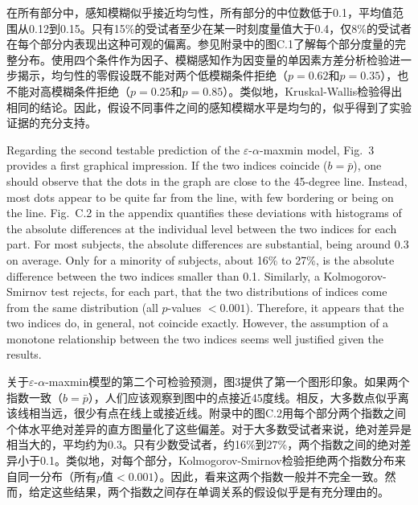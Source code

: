 \documentclass[12pt,a4paper]{article}
\newenvironment{original}
  {\par\medskip\noindent\color{black}\ignorespaces}
  {\par\medskip}
\newenvironment{translation}
  {\par\noindent\color{transblue}\ignorespaces}
  {\par\medskip\medskip}
\begin{document}
\begin{translation}
在所有部分中，感知模糊似乎接近均匀性，所有部分的中位数低于0.1，平均值范围从0.12到0.15。只有15\%的受试者至少在某一时刻度量值大于0.4，仅8\%的受试者在每个部分内表现出这种可观的偏离。参见附录中的图C.1了解每个部分度量的完整分布。使用四个条件作为因子、模糊感知作为因变量的单因素方差分析检验进一步揭示，均匀性的零假设既不能对两个低模糊条件拒绝（$p = 0.62$和$p = 0.35$），也不能对高模糊条件拒绝（$p = 0.25$和$p = 0.85$）。类似地，Kruskal-Wallis检验得出相同的结论。因此，假设不同事件之间的感知模糊水平是均匀的，似乎得到了实验证据的充分支持。
\end{translation}

\begin{original}
Regarding the second testable prediction of the $\varepsilon$-$\alpha$-maxmin model, Fig.\ 3 provides a first graphical impression. If the two indices coincide ($b = \bar{p}$), one should observe that the dots in the graph are close to the 45-degree line. Instead, most dots appear to be quite far from the line, with few bordering or being on the line. Fig.\ C.2 in the appendix quantifies these deviations with histograms of the absolute differences at the individual level between the two indices for each part. For most subjects, the absolute differences are substantial, being around 0.3 on average. Only for a minority of subjects, about 16\% to 27\%, is the absolute difference between the two indices smaller than 0.1. Similarly, a Kolmogorov-Smirnov test rejects, for each part, that the two distributions of indices come from the same distribution (all $p$-values $< 0.001$). Therefore, it appears that the two indices do, in general, not coincide exactly. However, the assumption of a monotone relationship between the two indices seems well justified given the results.
\end{original}

\begin{translation}
关于$\varepsilon$-$\alpha$-maxmin模型的第二个可检验预测，图3提供了第一个图形印象。如果两个指数一致（$b = \bar{p}$），人们应该观察到图中的点接近45度线。相反，大多数点似乎离该线相当远，很少有点在线上或接近线。附录中的图C.2用每个部分两个指数之间个体水平绝对差异的直方图量化了这些偏差。对于大多数受试者来说，绝对差异是相当大的，平均约为0.3。只有少数受试者，约16\%到27\%，两个指数之间的绝对差异小于0.1。类似地，对每个部分，Kolmogorov-Smirnov检验拒绝两个指数分布来自同一分布（所有$p$值$< 0.001$）。因此，看来这两个指数一般并不完全一致。然而，给定这些结果，两个指数之间存在单调关系的假设似乎是有充分理由的。
\end{translation}
\end{document}
